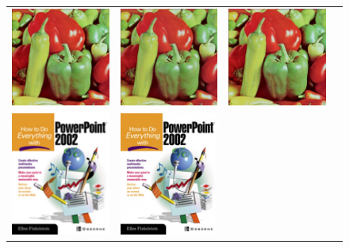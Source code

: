\documentclass[10pt,twocolumn,letterpaper]{article}
\begin{document}
\begin{figure}[h!]
\begin{tabular}{cccc}
\includegraphics[width=1.5in]{images/used/appendix/jpg/Set14/pepper_SRResNet-MSE} &
\includegraphics[width=1.5in]{images/used/appendix/jpg/Set14/pepper_SRGAN-VGG54} &
\includegraphics[width=1.5in]{images/used/appendix/jpg/Set14/pepper_HR} \\
\includegraphics[width=1.5in]{images/used/appendix/jpg/Set14/ppt3_bicubic}&
\includegraphics[width=1.5in]{images/used/appendix/jpg/Set14/ppt3_SRResNet-MSE} &

\end{tabular}
\end{figure}
\end{document}

